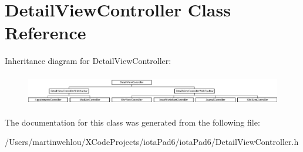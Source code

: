 \hypertarget{interface_detail_view_controller}{
\section{DetailViewController Class Reference}
\label{interface_detail_view_controller}
}
Inheritance diagram for DetailViewController:\begin{figure}[H]
\begin{center}
\leavevmode
\includegraphics[height=1.379310cm]{interface_detail_view_controller}
\end{center}
\end{figure}


The documentation for this class was generated from the following file:\begin{DoxyCompactItemize}
\item 
/Users/martinwehlou/XCodeProjects/iotaPad6/iotaPad6/DetailViewController.h\end{DoxyCompactItemize}
